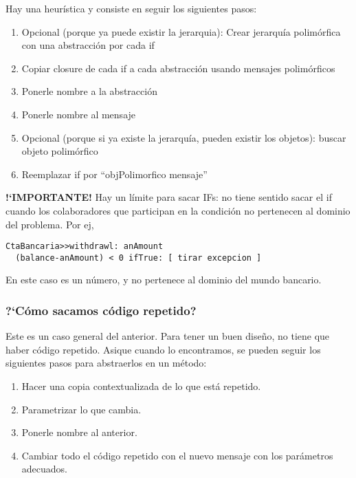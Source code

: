 Hay una heur\'istica y consiste en seguir los siguientes pasos:
\begin{enumerate}
\itemsep-0.3em
\item Opcional (porque ya puede existir la jerarquia): Crear jerarqu\'ia polim\'orfica con una abstracci\'on por cada if
\item Copiar closure de cada if a cada abstracci\'on usando mensajes polim\'orficos
\item Ponerle nombre a la abstracci\'on
\item Ponerle nombre al mensaje
\item Opcional (porque si ya existe la jerarqu\'ia, pueden existir los objetos): buscar objeto polim\'orfico
\item Reemplazar if por “objPolimorfico mensaje”
\end{enumerate}

\textbf{!`IMPORTANTE!} Hay un l\'imite para sacar IFs: no tiene sentido sacar el if cuando los colaboradores que participan en la condici\'on no pertenecen al dominio del problema. Por ej, 

\begin{verbatim}
CtaBancaria>>withdrawl: anAmount
  (balance-anAmount) < 0 ifTrue: [ tirar excepcion ]
\end{verbatim}

En este caso  es un n\'umero, y no pertenece al dominio del mundo bancario. 

\subsubsection{?`C\'omo sacamos c\'odigo repetido?}

Este es un caso general del anterior. Para tener un buen dise\~no, no tiene que haber c\'odigo repetido. Asique cuando lo encontramos, se pueden seguir los siguientes pasos para abstraerlos en un m\'etodo: 

\begin{enumerate}\itemsep-0.3em
 \item Hacer una copia contextualizada de lo que est\'a repetido. 
 \item Parametrizar lo que cambia. 
 \item Ponerle nombre al anterior. 
 \item Cambiar todo el c\'odigo repetido con el nuevo mensaje con los par\'ametros adecuados. 
\end{enumerate}
